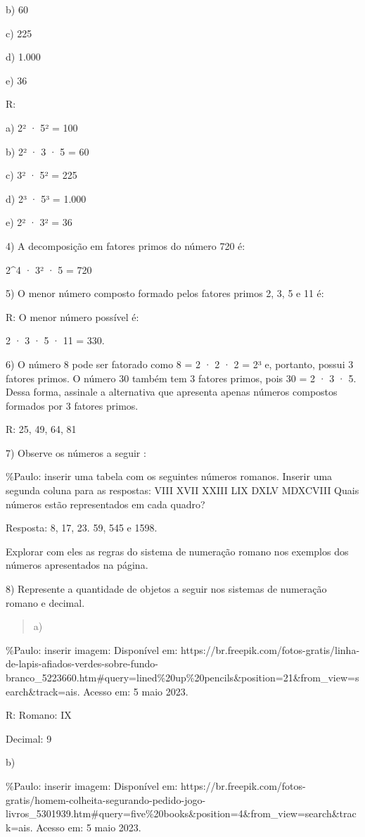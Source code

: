 b) 60

c) 225

d) 1.000

e) 36

R:

a) 2² · 5² = 100

b) 2² · 3 · 5 = 60

c) 3² · 5² = 225

d) 2³ · 5³ = 1.000

e) 2² · 3² = 36

4) A decomposição em fatores primos do número 720 é:

2\^{}4 · 3² · 5 = 720

5) O menor número composto formado pelos fatores primos 2, 3, 5 e 11 é:

R: O menor número possível é:

2 · 3 · 5 · 11 = 330.

6) O número 8 pode ser fatorado como 8 = 2 · 2 · 2 = 2³ e, portanto,
possui 3 fatores primos. O número 30 também tem 3 fatores primos, pois
30 = 2 · 3 · 5. Dessa forma, assinale a alternativa que apresenta apenas
números compostos formados por 3 fatores primos.

R: 25, 49, 64, 81

7) Observe os números a seguir :

\%Paulo: inserir uma tabela com os seguintes números romanos. Inserir
uma segunda coluna para as respostas: VIII XVII XXIII LIX DXLV MDXCVIII
Quais números estão representados em cada quadro?

Resposta: 8, 17, 23. 59, 545 e 1598.

Explorar com eles as regras do sistema de numeração romano nos exemplos
dos números apresentados na página.

8) Represente a quantidade de objetos a seguir nos sistemas de numeração
romano e decimal.

\begin{quote}
a)
\end{quote}

\%Paulo: inserir imagem: Disponível em:
https://br.freepik.com/fotos-gratis/linha-de-lapis-afiados-verdes-sobre-fundo-branco\_5223660.htm\#query=lined\%20up\%20pencils\&position=21\&from\_view=search\&track=ais.
Acesso em: 5 maio 2023.

R: Romano: IX

Decimal: 9

b)

\%Paulo: inserir imagem: Disponível em:
https://br.freepik.com/fotos-gratis/homem-colheita-segurando-pedido-jogo-livros\_5301939.htm\#query=five\%20books\&position=4\&from\_view=search\&track=ais.
Acesso em: 5 maio 2023.

